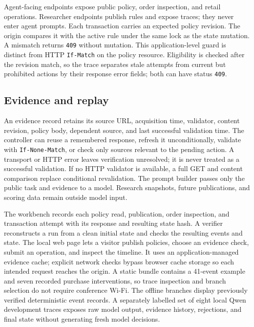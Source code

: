 \documentclass[sigconf,screen,review]{acmart}
\begin{document}
Agent-facing endpoints expose public policy, order inspection, and retail
operations. Researcher endpoints publish rules and expose traces; they
never enter agent prompts. Each transaction carries an expected policy
revision. The origin compares it with the active rule under the same lock
as the state mutation. A mismatch returns \texttt{409} without mutation.
This application-level guard is distinct from HTTP \texttt{If-Match} on
the policy resource. Eligibility is checked after the revision match, so
the trace separates stale attempts from current but prohibited actions by
their response error fields; both can have status \texttt{409}.

\subsection{Evidence and replay}
An evidence record retains its source URL, acquisition time, validator,
content revision, policy body, dependent source, and last successful
validation time. The controller can reuse a remembered response, refresh it
unconditionally, validate with \texttt{If-None-Match}, or check only sources
relevant to the pending action. A transport or HTTP error leaves verification
unresolved; it is never treated as a successful validation. If no HTTP
validator is available, a full GET and content comparison replace conditional
revalidation. The prompt builder
passes only the public task and evidence to a model. Research snapshots,
future publications, and scoring data remain outside model input.

The workbench records each policy read, publication, order inspection, and
transaction attempt with its response and resulting state hash. A verifier
reconstructs a run from a clean initial state and checks the resulting events
and state. The local web page lets a visitor publish policies, choose an
evidence check, submit an operation, and inspect the timeline. It uses an
application-managed evidence cache; explicit network checks bypass browser
cache storage so each intended request reaches the origin. A static bundle
contains a 41-event example and seven recorded purchase interventions, so
trace inspection and branch selection do not require conference Wi-Fi. The
offline branches display previously verified deterministic event records. A separately
labelled set of eight local Qwen development traces exposes raw model output,
evidence history, rejections, and final state without generating fresh model
decisions.
\end{document}

